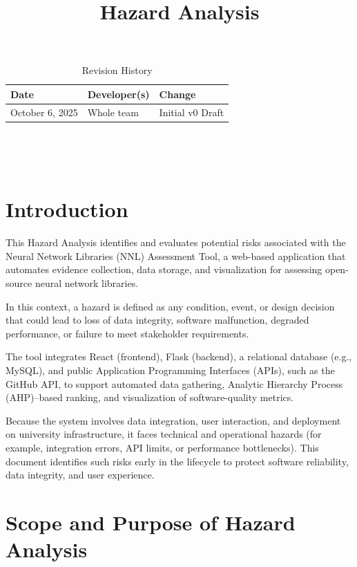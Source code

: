 \documentclass{article}
\title{Hazard Analysis\\\progname}
\author{\authname}
\date{}
\begin{document}
\maketitle
\thispagestyle{empty}


\begin{table}[hp]
\caption{Revision History} \label{TblRevisionHistory}
\begin{tabularx}{\textwidth}{llX}
\toprule
\textbf{Date} & \textbf{Developer(s)} & \textbf{Change}\\
\midrule
October 6, 2025  & Whole team & Initial v0 Draft\\
\bottomrule
\end{tabularx}
\end{table}

~\newpage

\tableofcontents

~\newpage


\section{Introduction}


This Hazard Analysis identifies and evaluates potential risks associated with
the Neural Network Libraries (NNL) Assessment Tool, a web-based application that
automates evidence collection, data storage, and visualization for assessing
open-source neural network libraries. 

In this context, a hazard is defined as any condition, event, or design
decision that could lead to loss of data integrity, software malfunction,
degraded performance, or failure to meet stakeholder requirements.

The tool integrates React (frontend), Flask (backend), a relational database
(e.g., MySQL), and public Application Programming Interfaces (APIs), such as the
GitHub API, to support automated data gathering, Analytic Hierarchy Process
(AHP)--based ranking, and visualization of software-quality metrics.

Because the system involves data integration, user interaction, and deployment
on university infrastructure, it faces technical and operational hazards (for
example, integration errors, API limits, or performance bottlenecks). This
document identifies such risks early in the lifecycle to protect software
reliability, data integrity, and user experience.

\section{Scope and Purpose of Hazard Analysis}
\end{document}
